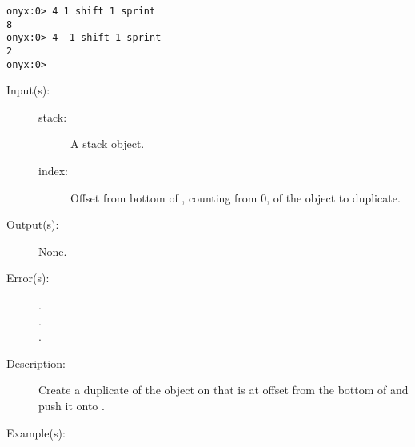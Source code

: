 \begin{description}
\begin{description}
\begin{verbatim}
onyx:0> 4 1 shift 1 sprint
8
onyx:0> 4 -1 shift 1 sprint
2
onyx:0>
		\end{verbatim}
	\end{description}
\label{systemdict:sibdup}
\item[{\onyxop{stack index}{sibdup}{--}}: ]
	\begin{description}\item[]
	\item[Input(s): ]
		\begin{description}\item[]
		\item[stack: ]
			A stack object.
		\item[index: ]
			Offset from bottom of , counting from 0, of
			the object to duplicate.
		\end{description}
	\item[Output(s): ] None.
	\item[Error(s): ]
		\begin{description}\item[]
		\item[.]
		\item[.]
		\item[.]
		\end{description}
	\item[Description: ]
		Create a duplicate of the object on  that is at
		offset  from the bottom of  and push
		it onto .
	\item[Example(s): ]\begin{verbatim}


\end{verbatim}
\end{description}
\end{description}
